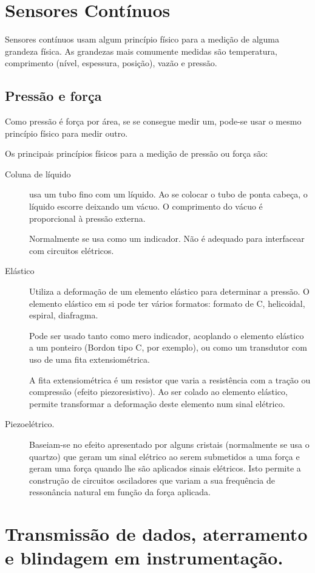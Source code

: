 \section{Sensores Contínuos}

Sensores contínuos usam algum princípio físico para a medição de alguma grandeza física. As grandezas mais comumente medidas são temperatura, comprimento (nível, espessura, posição), vazão e pressão.

\subsection{Pressão e força}
\label{sub:Pressão e força}
Como pressão é força por área, se se consegue medir um, pode-se usar o mesmo princípio físico para medir outro.

Os principais princípios físicos para a medição de pressão ou força são:
\begin{description}
  \item[Coluna de líquido] usa um tubo fino com um líquido. Ao se colocar o tubo de ponta cabeça, o líquido escorre deixando um vácuo. O comprimento do vácuo é proporcional à pressão externa.

  Normalmente se usa como um indicador. Não é adequado para interfacear com circuitos elétricos.

  \item[Elástico] Utiliza a deformação de um elemento elástico para determinar a pressão. O elemento elástico em si pode ter vários formatos: formato de C, helicoidal, espiral, diafragma.

  Pode ser usado tanto como mero indicador, acoplando o elemento elástico a um ponteiro (Bordon tipo C, por exemplo), ou como um transdutor com uso de uma fita extensiométrica.

  A fita extensiométrica é um resistor que varia a resistência com a tração ou compressão (efeito piezoresistivo). Ao ser colado ao elemento elástico, permite transformar a deformação deste elemento num sinal elétrico.

  \item[Piezoelétrico.] Baseiam-se no efeito apresentado por alguns cristais (normalmente se usa o quartzo) que geram um sinal elétrico ao serem submetidos a uma força e geram uma força quando lhe são aplicados sinais elétricos. Isto permite a construção de circuitos osciladores que variam a sua frequência de ressonância natural em função da força aplicada.
\end{description}

\section{Transmissão de dados, aterramento e blindagem em instrumentação.}
